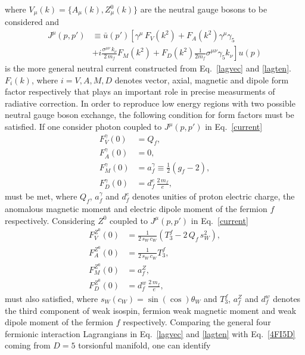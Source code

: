 where $V_\mu(k) = \{A_\mu(k),Z^0_\mu(k)\}$ are the neutral gauge bosons to be considered and
\begin{align}
\nonumber
 J^\mu(p,p') &\equiv \bar{u}(p')\left[\gamma^\mu\,F_V(k^2) +F_A(k^2)\gamma^\mu\gamma_5 \right. \\ 
 \label{current}
 &\left.+ i\frac{\sigma^{\mu\nu}\,k_\nu}{2\,m_f}F_M(k^2) + F_D(k^2)\frac{1}{2m_f}\sigma^{\mu\nu}\gamma_5 k_\nu\right]u(p)
\end{align}
is the more general neutral current constructed from Eq.~\eqref{lagvec} and \eqref{lagten}. $F_i(k)$, where $i=V,A,M,D$ denotes vector, axial, magnetic and dipole form factor respectively that plays an important role in precise measurments of radiative correction. In order to reproduce low energy regions with two possible neutral gauge boson exchange, the following condition for form factors must be satisfied. If one consider photon coupled to $J^\mu(p,p')$ in Eq.~\eqref{current}
\begin{align}
F_V^\gamma(0) &= Q_f,  \\
F_A^\gamma(0) &= 0, \\
F_M^\gamma(0) &= a_f^\gamma \equiv \frac{1}{2}\left(g_f-2\right),\\
F_D^\gamma(0) &= d_f^e\,\frac{2\,m_f}{e},
\end{align}
must be met, where $Q_f$, $a_f^\gamma$ and $d_f^e$ denotes unities of proton electric charge, the anomalous magnetic moment and electric dipole moment of the fermion $f$ respectively. Considering $Z^0$ coupled to $J^\mu(p,p')$ in Eq.~\eqref{current}
\begin{align}
F_V^{Z^0}(0) &= \frac{1}{2\,s_W\,c_W}\left(T_3^f - 2\,Q_f\,s_W^2\right), \\
F_A^{Z^0}(0) &=  \frac{1}{2\,s_W\,c_W}T_3^f, \\
F_M^{Z^0}(0) &= a_f^Z, \\
F_D^{Z^0}(0) &= d_f^w\,\frac{2\,m_f}{e}, 
\end{align}
must also satisfied, where $s_W(c_W) = \sin(\cos)\theta_W$ and $T_3^f$, $a_f^Z$ and $d_f^w$ denotes the third component of weak isospin, fermion weak magnetic moment and weak dipole moment of the fermion $f$ respectively. Comparing the general four fermionic interaction Lagrangians in Eq.~\eqref{lagvec} and \eqref{lagten} with Eq.~\eqref{4FI5D} coming from $D = 5$ torsionful manifold, one can identify
